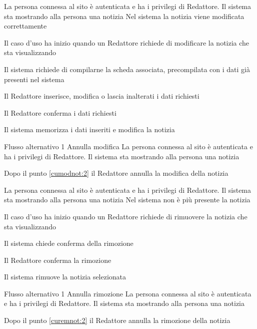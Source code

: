 
{}
{La persona connessa al sito è autenticata e ha i privilegi di Redattore. Il sistema sta mostrando alla persona una notizia}
{Nel sistema la notizia viene modificata correttamente}
{\begin{enumCU}
	\item Il caso d'uso ha inizio quando un Redattore richiede di modificare la notizia che sta visualizzando
	\item Il sistema richiede di compilarne la scheda associata, precompilata con i dati già presenti nel sistema 
	\item Il Redattore inserisce, modifica o lascia inalterati i dati richiesti\label{cumodnot:2}
	\item Il Redattore conferma i dati richiesti
	\item Il sistema memorizza i dati inseriti e modifica la notizia
\end{enumCU}}
%
{Flusso alternativo 1}%
{Annulla modifica}%
{La persona connessa al sito è autenticata e ha i privilegi di Redattore. Il sistema sta mostrando alla persona una notizia}%
{\postNulle}%
{\begin{enumCU}
		\item Dopo il punto \ref{cumodnot:2} il Redattore annulla la modifica della notizia
\end{enumCU}}%


{}
{La persona connessa al sito è autenticata e ha i privilegi di Redattore. Il sistema sta mostrando alla persona una notizia}
{Nel sistema non è più presente la notizia}
{\begin{enumCU}
	\item Il caso d'uso ha inizio quando un Redattore richiede di rimuovere la notizia che sta visualizzando
	\item Il sistema chiede conferma della rimozione\label{curemnot:2}
	\item Il Redattore conferma la rimozione
	\item Il sistema rimuove la notizia selezionata
\end{enumCU}}
%
{Flusso alternativo 1}%
{Annulla rimozione}%
{La persona connessa al sito è autenticata e ha i privilegi di Redattore. Il sistema sta mostrando alla persona una notizia}%
{\postNulle}%
{\begin{enumCU}
		\item Dopo il punto \ref{curemnot:2} il Redattore annulla la rimozione della notizia
	\end{enumCU}}%

